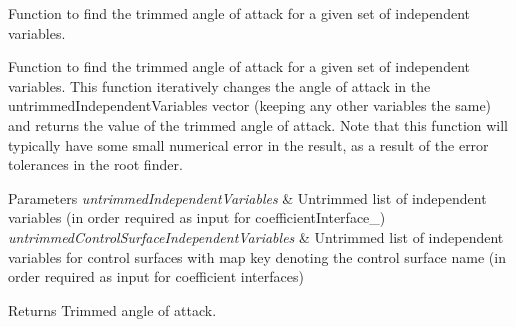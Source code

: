 Function to find the trimmed angle of attack for a given set of independent variables. 

Function to find the trimmed angle of attack for a given set of independent variables. This function iteratively changes the angle of attack in the untrimmed\+Independent\+Variables vector (keeping any other variables the same) and returns the value of the trimmed angle of attack. Note that this function will typically have some small numerical error in the result, as a result of the error tolerances in the root finder. 
\begin{DoxyParams}{Parameters}
{\em untrimmed\+Independent\+Variables} & Untrimmed list of independent variables (in order required as input for coefficient\+Interface\+\_\+) \\
\hline
{\em untrimmed\+Control\+Surface\+Independent\+Variables} & Untrimmed list of independent variables for control surfaces with map key denoting the control surface name (in order required as input for coefficient interfaces) \\
\hline
\end{DoxyParams}
\begin{DoxyReturn}{Returns}
Trimmed angle of attack. 
\end{DoxyReturn}
